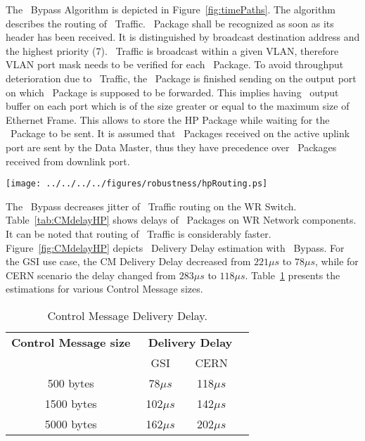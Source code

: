 The \HP\ Bypass Algorithm is depicted in Figure~\ref{fig:timePaths}. The
algorithm describes the routing of \HP\ Traffic. \HP\ Package shall be recognized as
soon as its header has been received. It is distinguished by broadcast
destination address and the highest priority (7). \HP\ Traffic is broadcast
within a given VLAN, therefore VLAN port mask needs to be verified for each \HP\
Package. To avoid throughput deterioration due to \HP\ Traffic, the \SP\ Package
is finished sending on the output port on which \HP\ Package is supposed
to be forwarded. This implies having \HP\ output buffer on each port which is
of the size greater or equal to the maximum size of Ethernet Frame. This allows
to store the HP Package while waiting for the \SP\ Package to be sent. It is assumed
that \HP\ Packages received on the active uplink port are sent by the Data
Master, thus they have precedence over \HP\ Packages received from downlink
port.
 
\begin{center}
	\texttt{[image: ../../../../figures/robustness/hpRouting.ps]}
	\label{fig:timePaths}
\end{center}


The \HP\ Bypass decreases jitter of \HP\ Traffic routing
on the WR Switch. Table~\ref{tab:CMdelayHP} shows delays of \HP\ Packages on WR
Network components. It can be noted that routing of \HP\ Traffic is considerably
faster. Figure~\ref{fig:CMdelayHP} depicts \ControlMessage\ Delivery Delay
estimation with \HP\ Bypass. For the GSI use case, the CM Delivery Delay
decreased from $221\mu s$ to $78\mu s$, while for CERN scenario the delay
changed from $283\mu s$ to $118\mu s$. Table~\ref{tab:CMspDelay} presents the
estimations for various Control Message sizes.

\begin{table}[ht]
\caption{Control Message Delivery Delay.} 
\centering
	\begin{tabular}{| c | c | c | c |}          \hline
\textbf{Control Message size}& \multicolumn{2}{|c|}{\textbf{\ControlMessage\
Delivery Delay}}\\
               &    GSI           & CERN          \\ \hline
500 bytes      & 78$\mu s$        & 118$\mu s$    \\ \hline
1500 bytes     & 102$\mu s$       & 142$\mu s$    \\ \hline
5000 bytes     & 162$\mu s$       & 202$\mu s$    \\ \hline
\end{tabular}
\label{tab:CMspDelay}
\end{table}


